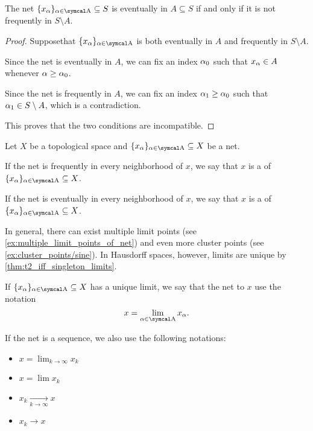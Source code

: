\begin{proposition}\label{thm:topological_net_eventually_in_iff_not_frequently_in_complement}
  The net \( \{ x_\al \}_{\al \in \CA} \subseteq S \) is eventually in \( A \subseteq S \) if and only if it is not frequently in \( S \setminus A \).
\end{proposition}
\begin{proof}
  Suppose\LEM that \( \{ x_\al \}_{\al \in \CA} \) is both eventually in \( A \) and frequently in \( S \setminus A \).

  Since the net is eventually in \( A \), we can fix an index \( \alpha_0 \) such that \( x_\alpha \in A \) whenever \( \alpha \geq \alpha_0 \).

  Since the net is frequently in \( A \), we can fix an index \( \alpha_1 \geq \alpha_0 \) such that \( \alpha_1 \in S \setminus A \), which is a contradiction.

  This proves that the two conditions are incompatible.
\end{proof}

\begin{definition}\label{def:topological_net_convergence}
  Let \( X \) be a topological space and \( \{ x_\al \}_{\al \in \CA} \subseteq X \) be a net.

  \begin{defenum}
     If the net is frequently in every neighborhood of \( x \), we say that \( x \) is a  of \( \{ x_\al \}_{\al \in \CA} \subseteq X \).

     If the net is eventually in every neighborhood of \( x \), we say that \( x \) is a  of \( \{ x_\al \}_{\al \in \CA} \subseteq X \).
  \end{defenum}

  In general, there can exist multiple limit points (see \cref{ex:multiple_limit_points_of_net}) and even more cluster points (see \cref{ex:cluster_points/sine}). In Hausdorff spaces, however, limits are unique by \cref{thm:t2_iff_singleton_limits}.

  If \( \{ x_\al \}_{\al \in \CA} \subseteq X \) has a unique limit, we say that the net  to \( x \) use the notation
  \begin{equation*}
    x = \lim_{\al \in \CA} x_\al.
  \end{equation*}

  If the net is a sequence, we also use the following notations:
  \begin{itemize}
    \item \( x = \lim_{k \to \infty} x_k \)
    \item \( x = \lim x_k \)
    \item \( x_k \xrightarrow[k \to \infty]{} x \)
    \item \( x_k \to x \)
  \end{itemize}
\end{definition}

